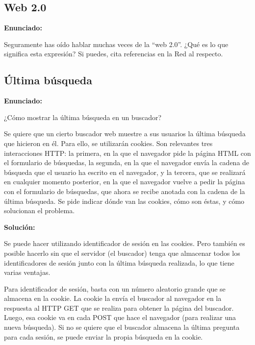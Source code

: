 \subsection{Web 2.0}
\label{subsec:web-20}

\textbf{Enunciado:}

Seguramente has oído hablar muchas veces de la ``web 2.0''. ¿Qué es lo que significa esta expresión? Si puedes, cita referencias en la Red al respecto.

\subsection{Última búsqueda}
\label{subsec:ultima-busqueda}

\textbf{Enunciado:}

¿Cómo mostrar la última búsqueda en un  buscador?

Se quiere que un cierto buscador web muestre a sus usuarios la última búsqueda que hicieron en él. Para ello, se utilizarán cookies. Son relevantes tres interacciones HTTP: la primera, en la que el navegador pide la página HTML con el formulario de búsquedas, la segunda, en la que el navegador envía la cadena de búsqueda que el usuario ha escrito en el navegador, y la tercera, que se realizará en cualquier momento posterior, en la que el navegador vuelve a pedir la página con el formulario de búsquedas, que ahora se recibe anotada con la cadena de la última búsqueda. Se pide indicar dónde van las cookies, cómo son éstas, y cómo solucionan el problema.

\textbf{Solución:}

Se puede hacer utilizando identificador de sesión en las cookies. Pero también es posible hacerlo sin que el servidor (el buscador) tenga que almacenar todos los identificadores de sesión  junto con la última búsqueda realizada, lo que tiene varias ventajas.

Para identificador de sesión, basta con un número aleatorio grande que se almacena en la cookie. La cookie la envía el buscador al navegador en la respuesta al HTTP GET que se realiza para obtener la página del buscador. Luego, esa cookie va en cada POST que hace el navegador (para realizar una nueva búsqueda). Si no se quiere que el buscador almacena la última pregunta para cada sesión, se puede enviar la propia búsqueda en la cookie.   

